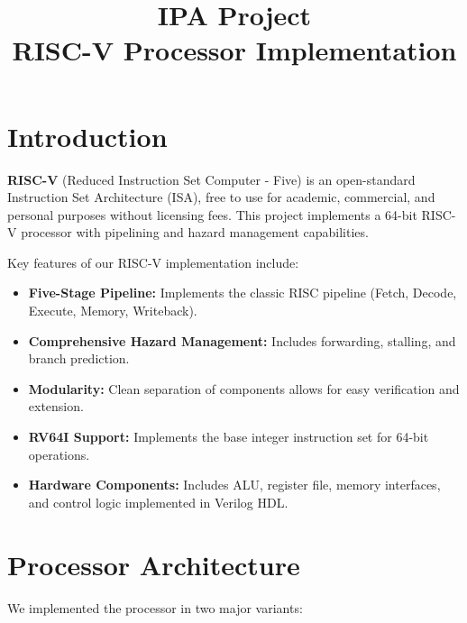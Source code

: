 \documentclass[conference]{IEEEtran}
\begin{document}
\title{IPA Project\\RISC-V Processor Implementation}

\author{
\and
{}
\and
{}
}

\maketitle

\section{Introduction}
\textbf{RISC-V} (Reduced Instruction Set Computer - Five) is an open-standard Instruction Set Architecture (ISA), free to use for academic, commercial, and personal purposes without licensing fees. This project implements a 64-bit RISC-V processor with pipelining and hazard management capabilities.

Key features of our RISC-V implementation include:

\begin{itemize}
    \item \textbf{Five-Stage Pipeline:} Implements the classic RISC pipeline (Fetch, Decode, Execute, Memory, Writeback).
    
    \item \textbf{Comprehensive Hazard Management:} Includes forwarding, stalling, and branch prediction.
    
    \item \textbf{Modularity:} Clean separation of components allows for easy verification and extension.
    
    \item \textbf{RV64I Support:} Implements the base integer instruction set for 64-bit operations.
    
    \item \textbf{Hardware Components:} Includes ALU, register file, memory interfaces, and control logic implemented in Verilog HDL.
\end{itemize}

\section{Processor Architecture}
We implemented the processor in two major variants:
\end{document}
